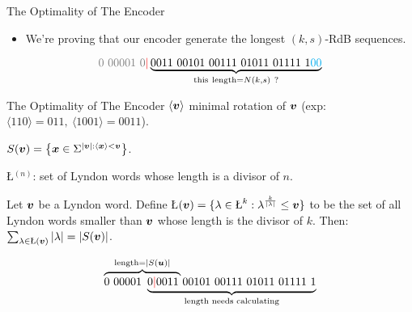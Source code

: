 \begin{frame}{The Optimality of The Encoder }
    \begin{itemize}
        \item We're proving that our encoder generate the longest $(k,s)$-RdB sequences.
    \end{itemize}
    \begin{example}[$k=5,s=2$]
    $${\color{gray}0\ 00001\ 0} {\color{red}|}\underbrace{0011\ 00101\ 00111\ 01011\ 01111\ 1 {\color{cyan}00}}_{\mathrm{this\ length}=N(k,s)\ ?} $$
    \end{example}
    
\end{frame}

\begin{frame}{The Optimality of The Encoder}
$\langle {\boldsymbol v}\rangle$ minimal rotation of ${\boldsymbol v}$ (exp: $\langle110\rangle=011,\ \langle1001\rangle=0011$).

$S({\boldsymbol v}) = \left\{{\boldsymbol x}\in\Sigma^{\left \lvert {\boldsymbol v} \right \rvert:\langle{\boldsymbol x}\rangle<{\boldsymbol v}} \right\}$.

\L$^{(n)}$: set of Lyndon words whose length is a divisor of $n$.

\begin{lemma}
    Let ${\boldsymbol v}$ be a Lyndon word. Define \L$(\bfv) = \{\lambda\in\text{\L}^k:\lambda^{\frac{k}{\card{\lambda}}}\leq\bfv\}$ to be the set of all Lyndon words smaller than ${\boldsymbol v}$ whose length is the divisor of $k$. Then: $\sum_{\lambda\in\text{\L}(\bfv)}\card{\lambda}=\card{S(\bfv)}$.
\end{lemma}

\[\lefteqn{\overbrace{\phantom{0\ 00001\ 0{\color{red}|}0011\ }}^{\mathrm{length}=\card{S(\bfu)}}}
0\ 00001\ \underbrace{0{\color{red}|}0011\ 00101\ 00111\ 01011\ 01111\ 1}_{\text{length needs calculating}}\]
\end{frame}

